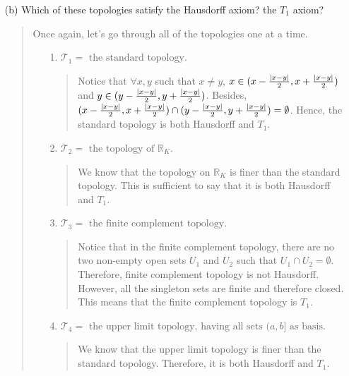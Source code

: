 \documentclass[12pt, a4paper]{article}
\newcommand{\reals}{\mathbb{R}} %
\newcommand{\topology}{\mathcal{T}} %
\DeclarePairedDelimiter\abs{\lvert}{\rvert}
\begin{document}
\begin{itemize}
\begin{itemize}
\item[]
\item[]

\item[(b)]
Which of these topologies satisfy the Hausdorff axiom? the $T_1$ axiom?
\begin{quote}
Once again, let's go through all of the topologies one at a time.
\begin{itemize}
\item[1.]
$\topology_1 = \mbox{ the standard topology.}$
\begin{quote}
Notice that $\forall x, y$ such that $x \neq y$, $x \in (x - \frac{{\abs{x - y}}}{2}, x + \frac{{\abs{x - y}}}{2})$
and $y \in (y - \frac{{\abs{x - y}}}{2}, y + \frac{{\abs{x - y}}}{2})$. Besides, $(x - \frac{{\abs{x - y}}}{2}, x + \frac{{\abs{x - y}}}{2}) \cap (y - \frac{{\abs{x - y}}}{2}, y + \frac{{\abs{x - y}}}{2}) = \emptyset$. Hence, the standard
topology is both Hausdorff and $T_1$.
\end{quote}

\item[]

\item[2.]
$\topology_2 = \mbox{ the topology of $\reals_K$.}$
\begin{quote}
We know that the topology on $\reals_K$ is finer than
the standard topology. This is sufficient to say that
it is both Hausdorff and $T_1$.
\end{quote}

\item[]

\item[3.]
$\topology_3 = \mbox{ the finite complement topology.}$
\begin{quote}
Notice that in the finite complement topology, there are no two non-empty open sets $U_1$ and $U_2$ such that $U_1 \cap U_2 = \emptyset$. Therefore, finite complement topology is not
Hausdorff. However, all the singleton sets are finite and therefore closed. This means that the finite complement topology is $T_1$.

\end{quote}

\item[]

\item[4.]
$\topology_4 = \mbox{ the upper limit topology, having all sets $(a, b]$ as basis.}$
\begin{quote}
We know that the upper limit topology is finer than the standard topology. Therefore, it is both Hausdorff and $T_1$.
\end{quote}


\end{itemize}
\end{quote}
\end{itemize}
\end{itemize}
\end{document}

